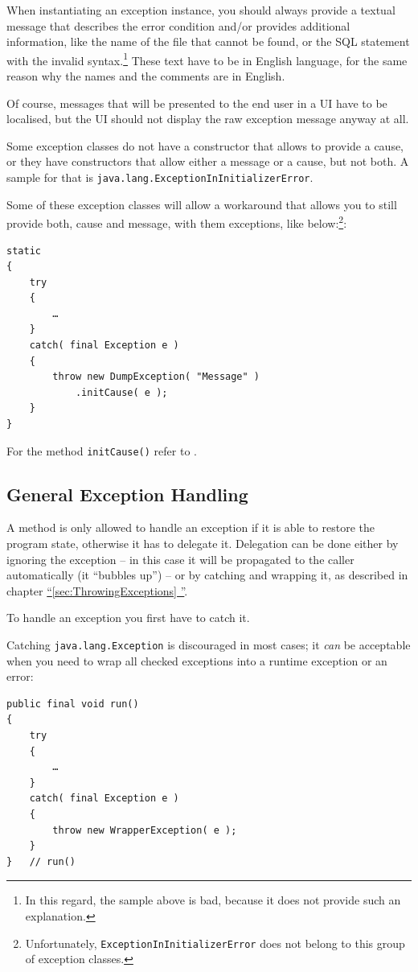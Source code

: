 \documentclass[11pt,a4paper, titlepage, parskip=half, headsepline, footsepline, cleardoublepage=current, headheight=1cm]{scrbook}
\newcommand*{\tqfullref}[1]{\hyperref[{#1}]{“\ref*{#1} \nameref*{#1}”}}
\begin{document}
When instantiating an exception instance, you should always provide a textual message that describes the error condition and/or provides additional information, like the name of the file that cannot be found, or the SQL statement with the invalid syntax.\footnote{In this regard, the sample above is bad, because it does not provide such an explanation.} These text have to be in English language, for the same reason why the names and the comments are in English.

Of course, messages that will be presented to the end user in a UI have to be localised, but the UI should not display the raw exception message anyway at all.

Some exception classes do not have a constructor that allows to provide a cause, or they have constructors that allow either a message or a cause, but not both. A sample for that is \lstinline|java.lang.ExceptionInInitializerError|\autocite{ORACLE_DOC_EXCEPTIONININITIALIZERERROR_CLASS}.

Some of these exception classes will allow a workaround that allows you to still provide both, cause and message, with them exceptions, like below:\footnote{Unfortunately, \lstinline|ExceptionInInitializerError| does not belong to this group of exception classes.}: 
\begin{lstlisting}
static
{
    try
    {
        …    
    }
    catch( final Exception e )
    {
        throw new DumpException( "Message" )
            .initCause( e );    
    }
}
\end{lstlisting}

For the method \lstinline|initCause()| refer to \autocite{ORACLE_DOC_THROWABLE_CLASS:initCause}.

\subsection{General Exception Handling}\label{sec:GeneralExceptionHandling}
A method is only allowed to handle an exception if it is able to restore the program state, otherwise it has to delegate it. Delegation can be done either by ignoring the exception – in this case it will be propagated to the caller automatically (it “bubbles up”) – or by catching and wrapping it, as described in chapter \tqfullref{sec:ThrowingExceptions}.

To handle an exception you first have to catch it.

Catching \lstinline|java.lang.Exception| is discouraged in most cases; it \textit{can} be acceptable when you need to wrap all checked exceptions into a runtime exception or an error:
\begin{lstlisting}
public final void run()
{
    try
    {
        …
    }
    catch( final Exception e )
    {
        throw new WrapperException( e );
    }
}   // run()
\end{lstlisting}
\end{document}

